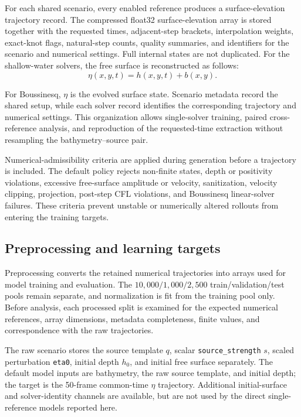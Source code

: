 For each shared scenario, every enabled reference produces a surface-elevation trajectory record. The compressed float32 surface-elevation array is stored together with the requested times, adjacent-step brackets, interpolation weights, exact-knot flags, natural-step counts, quality summaries, and identifiers for the scenario and numerical settings. Full internal states are not duplicated. For the shallow-water solvers, the free surface is reconstructed as follows:
\begin{equation}
\eta(x,y,t)=h(x,y,t)+b(x,y).
\end{equation}

For Boussinesq, $\eta$ is the evolved surface state. Scenario metadata record the shared setup, while each solver record identifies the corresponding trajectory and numerical settings. This organization allows single-solver training, paired cross-reference analysis, and reproduction of the requested-time extraction without resampling the bathymetry--source pair.

Numerical-admissibility criteria are applied during generation before a trajectory is included. The default policy rejects non-finite states, depth or positivity violations, excessive free-surface amplitude or velocity, sanitization, velocity clipping, projection, post-step CFL violations, and Boussinesq linear-solver failures. These criteria prevent unstable or numerically altered rollouts from entering the training targets.

\subsection{Preprocessing and learning targets}
\label{subsec:preprocessing-targets}

Preprocessing converts the retained numerical trajectories into arrays used for model training and evaluation. The $10{,}000 / 1{,}000 / 2{,}500$ train/validation/test pools remain separate, and normalization is fit from the training pool only. Before analysis, each processed split is examined for the expected numerical references, array dimensions, metadata completeness, finite values, and correspondence with the raw trajectories.

The raw scenario stores the source template $q$, scalar \texttt{source\_strength} $s$, scaled perturbation \texttt{eta0}, initial depth $h_0$, and initial free surface separately. The default model inputs are bathymetry, the raw source template, and initial depth; the target is the 50-frame common-time $\eta$ trajectory. Additional initial-surface and solver-identity channels are available, but are not used by the direct single-reference models reported here.

